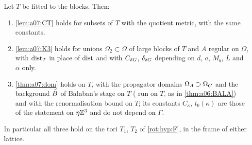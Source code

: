 \begin{lemma}\label{lem:a07:K3torus}
Let $T$ be fitted to the blocks. Then:
\begin{enumerate}[label=\textup{(\alph*)},nosep,leftmargin=*]
\item \cref{lem:a07:CT} holds for subsets of $T$ with the quotient metric, with the same constants.
\item \cref{lem:a07:K3} holds for unions $\Omega_2\subset\Omega$ of large blocks of $T$ and $A$ regular on $\Omega$, with $\operatorname{dist}_T$ in place of $\operatorname{dist}$ and with $C_{\delta G}$, $\delta_{\delta G}$ depending on $d$, $a$, $M_b$, $L$ and $\alpha$ only.
\item \cref{thm:a07:dom} holds on $T$, with the propagator domains $\Omega_{A}\supset\Omega_{C}$ and the background $\tilde B$ of Ba{\l}aban's stage on $T$ (\cite[Sect.~2]{Ba2} run on $T$, as in \cref{thm:a06:BALA}) and with the renormalisation bound \cite[Prop.~1, (1.33)]{Ba3} on $T$; its constants $C_\kappa$, $t_0(\kappa)$ are those of the statement on $\eta\mathbb Z^3$ and do not depend on $\Gamma$.
\end{enumerate}
In particular all three hold on the tori $T_1$, $T_2$ of \cref{rot:hyp:F}, in the frame of either lattice.
\end{lemma}
